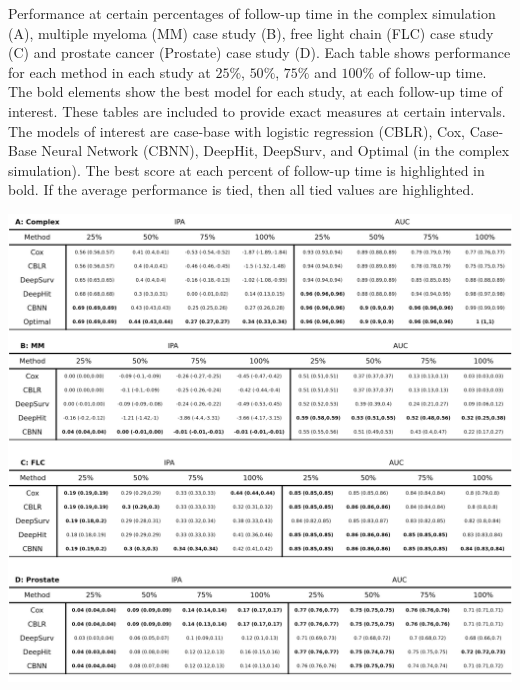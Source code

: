 \documentclass[APA,LATO1COL]{WileyNJD-v2}
\begin{document}
\begin{table}[!htbp]
\caption{Performance at certain percentages of follow-up time in the complex simulation (A), multiple myeloma (MM) case study (B), free light chain (FLC)
case study (C) and prostate cancer (Prostate) case study (D). Each table shows performance for each method in each study at $25\%$, $50\%$, $75\%$
and $100\%$ of follow-up time. The bold elements show the best model for each study, at each follow-up time of interest. These tables are included to
provide exact measures at certain intervals. The models of interest are case-base with logistic regression (CBLR), Cox, Case-Base Neural Network (CBNN),
DeepHit, DeepSurv, and Optimal (in the complex simulation). The best score at each percent of follow-up time is highlighted in bold. If the average performance
is tied, then all tied values are highlighted.}
\label{tab:megaTable}

\begin{center}\includegraphics[width=1\linewidth]{../figures/Table2.pdf} \end{center}

\end{table}

\end{document}
